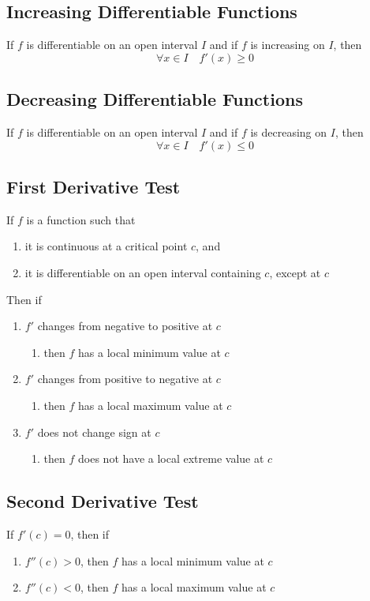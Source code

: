 \documentclass[../ma2002_notes.tex]{subfiles}
\begin{document}
\subsection{Increasing Differentiable Functions}
If \(f\) is differentiable on an open interval \(I\) and if \(f\) is increasing on \(I\), then
\[\forall x\in I\quad f'(x)\geq0\]

\subsection{Decreasing Differentiable Functions}
If \(f\) is differentiable on an open interval \(I\) and if \(f\) is decreasing on \(I\), then
\[\forall x\in I\quad f'(x)\leq0\]

\subsection{First Derivative Test}
If \(f\) is a function such that
\begin{enumerate}
	\item it is continuous at a critical point \(c\), and
	\item it is differentiable on an open interval containing \(c\), except at \(c\)
\end{enumerate}
Then if
\begin{enumerate}
	\item \(f'\) changes from negative to positive at \(c\)
	\begin{enumerate}
		\item then \(f\) has a local minimum value at \(c\)
	\end{enumerate}
	\item \(f'\) changes from positive to negative at \(c\)
	\begin{enumerate}
		\item then \(f\) has a local maximum value at \(c\)
	\end{enumerate}
	\item \(f'\) does not change sign at \(c\)
	\begin{enumerate}
		\item then \(f\) does not have a local extreme value at \(c\)
	\end{enumerate}
\end{enumerate}

\subsection{Second Derivative Test}
If \(f'(c)=0\), then if
\begin{enumerate}
	\item \(f''(c)>0\), then \(f\) has a local minimum value at \(c\)
	\item \(f''(c)<0\), then \(f\) has a local maximum value at \(c\)
\end{enumerate}
\end{document}

